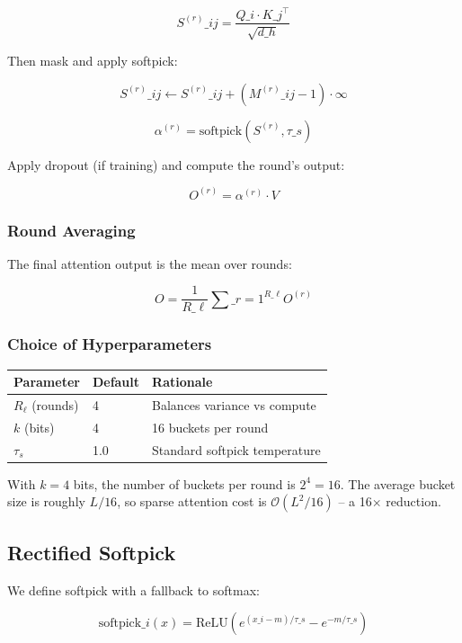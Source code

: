 \[
S^{(r)}\_{ij} = \frac{Q\_i \cdot K\_j^\top}{\sqrt{d\_h}}
\tag{4.19}
\]

Then mask and apply softpick:

\[
S^{(r)}\_{ij} \leftarrow S^{(r)}\_{ij} + (M^{(r)}\_{ij} - 1) \cdot \infty
\tag{4.20}
\]

\[
\alpha^{(r)} = \text{softpick}(S^{(r)}, \tau\_s)
\tag{4.21}
\]

Apply dropout (if training) and compute the round's output:

\[
O^{(r)} = \alpha^{(r)} \cdot V
\tag{4.22}
\]

\subsubsection{Round Averaging}

The final attention output is the mean over rounds:

\[
O = \frac{1}{R\_\ell} \sum\_{r=1}^{R\_\ell} O^{(r)}
\tag{4.23}
\]

\subsubsection{Choice of Hyperparameters}

\begin{table}[H]
\centering
\small
\begin{tabular}{lll}
\toprule
\textbf{Parameter} & \textbf{Default} & \textbf{Rationale} \\
\midrule
$R_\ell$ (rounds) & 4 & Balances variance vs compute \\
$k$ (bits) & 4 & 16 buckets per round \\
$\tau_s$ & 1.0 & Standard softpick temperature \\
\bottomrule
\end{tabular}
\end{table}

With $k = 4$ bits, the number of buckets per round is $2^4 = 16$. The average 
bucket size is roughly $L / 16$, so sparse attention cost is 
$\mathcal{O}(L^2 / 16)$ -- a 16$\times$ reduction.

\subsection{Rectified Softpick}

We define softpick with a fallback to softmax:

\[
\text{softpick}\_i(x) = \text{ReLU}\!\left(e^{(x\_i - m)/\tau\_s} - e^{-m/\tau\_s}\right)
\tag{4.24}
\]


